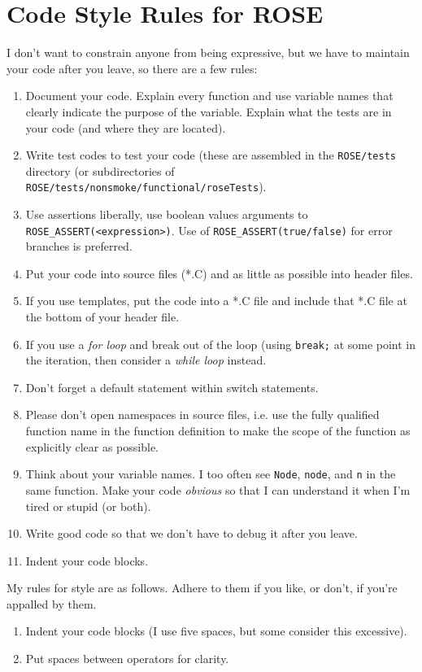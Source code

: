 \section{Code Style Rules for ROSE}%

   I don't want to constrain anyone from being expressive, but
we have to maintain your code after you leave, so there are a few rules:
\begin{enumerate}
   \item Document your code.
         Explain every function and use variable names that clearly indicate the purpose of
         the variable. Explain what the tests are in your code (and where they are located).
   \item Write test codes to test your code (these are assembled in the {\tt ROSE/tests}
         directory (or subdirectories of {\tt ROSE/tests/nonsmoke/functional/roseTests}).
   \item Use assertions liberally, use boolean values arguments to 
         {\tt ROSE\_ASSERT(<expression>)}. Use of {\tt ROSE\_ASSERT(true/false)} for
         error branches is preferred.
   \item Put your code into source files (*.C) and as little as possible into header files.
   \item If you use templates, put the code into a *.C file and include that *.C file
         at the bottom of your header file.
   \item If you use a {\em for loop} and break out of the loop (using {\tt break;} 
         at some point in the iteration, then consider a {\em while loop} instead.
   \item Don't forget a default statement within switch statements.
   \item Please don't open namespaces in source files, i.e. use the fully qualified
         function name in the function definition to make the scope of the function
         as explicitly clear as possible.
   \item Think about your variable names. I too often see {\tt Node}, {\tt node}, 
         and {\tt n} in the same function.  Make your code {\em obvious} so that I 
         can understand it when I'm tired or stupid (or both).
   \item Write good code so that we don't have to debug it after you leave.
   \item Indent your code blocks.
\end{enumerate}

My rules for style are as follows. Adhere to them if you like, or don't, if you're
    appalled by them.
\begin{enumerate}
   \item Indent your code blocks (I use five spaces, but some consider this excessive).
   \item Put spaces between operators for clarity.
\end{enumerate}

